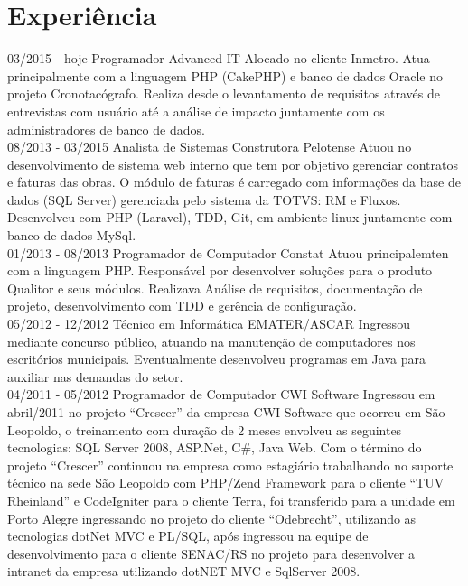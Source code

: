 \documentclass[]{friggeri-cv}
\begin{document}
\section{Experiência}
\begin{entrylist}
  \entry
    {03/2015 - hoje}
    {Programador}
    {Advanced IT}
    {Alocado no cliente Inmetro. Atua principalmente com a linguagem PHP (CakePHP) e banco de dados Oracle no projeto Cronotacógrafo. Realiza desde o levantamento de requisitos através de entrevistas com usuário até a análise de impacto juntamente com os administradores de banco de dados.\\}
  \entry
    {08/2013 - 03/2015}
    {Analista de Sistemas}
    {Construtora Pelotense}
    {Atuou no desenvolvimento de sistema web interno que tem por objetivo gerenciar contratos e faturas das obras. O módulo de faturas é carregado com informações da base de dados (SQL Server) gerenciada pelo sistema da TOTVS: RM e Fluxos. Desenvolveu com PHP (Laravel), TDD, Git, em ambiente linux juntamente com banco de dados MySql.\\}
    \entry
    {01/2013 - 08/2013}
    {Programador de Computador}
    {Constat}
    {Atuou principalemten com a linguagem PHP. Responsável por desenvolver soluções para o produto Qualitor e seus módulos. Realizava Análise de requisitos, documentação de projeto, desenvolvimento com TDD e gerência de configuração.\\}
    \entry
    {05/2012 - 12/2012}
    {Técnico em Informática}
    {EMATER/ASCAR}
    {Ingressou mediante concurso público, atuando na manutenção de computadores nos escritórios municipais. Eventualmente desenvolveu programas em Java para auxiliar nas demandas do setor.\\}
    \entry    
    {04/2011 - 05/2012}
    {Programador de Computador}
    {CWI Software}
    { Ingressou em abril/2011 no projeto “Crescer” da empresa CWI Software que ocorreu em São Leopoldo, o treinamento com duração de 2 meses envolveu as seguintes tecnologias: SQL Server 2008, ASP.Net, C\#, Java Web. Com o término do projeto “Crescer” continuou na empresa como estagiário trabalhando no suporte técnico na sede São Leopoldo com PHP/Zend Framework para o cliente “TUV Rheinland” e CodeIgniter para o cliente Terra, foi transferido para a unidade em Porto Alegre ingressando no projeto do cliente “Odebrecht”,
utilizando as tecnologias dotNet MVC e PL/SQL, após ingressou na equipe de desenvolvimento para o cliente SENAC/RS no projeto para desenvolver a intranet da empresa utilizando dotNET MVC e SqlServer
2008.\\}
\end{entrylist}
\end{document}
